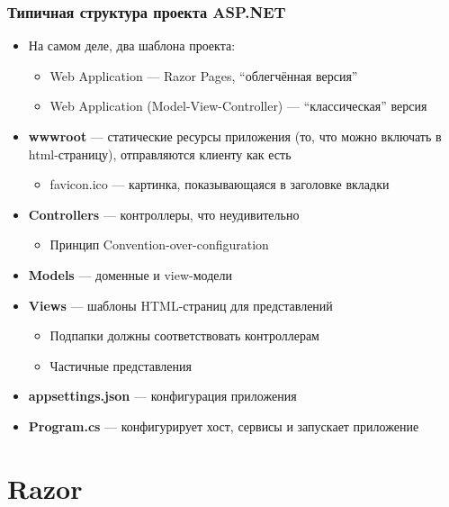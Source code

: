 \documentclass[xetex,mathserif,serif]{beamer}
\begin{document}
    \begin{frame}
        \frametitle{Типичная структура проекта ASP.NET}
        \begin{itemize}
            \item На самом деле, два шаблона проекта:
            \begin{itemize}
                \item Web Application --- Razor Pages, ``облегчённая версия''
                \item Web Application (Model-View-Controller) --- ``классическая'' версия
            \end{itemize}
            \item \textbf{wwwroot} --- статические ресурсы приложения (то, что можно включать в html-страницу), отправляются клиенту как есть
            \begin{itemize}
                \item favicon.ico --- картинка, показывающаяся в заголовке вкладки
            \end{itemize}
            \item \textbf{Controllers} --- контроллеры, что неудивительно
            \begin{itemize}
                \item Принцип Convention-over-configuration
            \end{itemize}
            \item \textbf{Models} --- доменные и view-модели
            \item \textbf{Views} --- шаблоны HTML-страниц для представлений
            \begin{itemize}
                \item Подпапки должны соответствовать контроллерам
                \item Частичные представления
            \end{itemize}
            \item \textbf{appsettings.json} --- конфигурация приложения
            \item \textbf{Program.cs} --- конфигурирует хост, сервисы и запускает приложение
        \end{itemize}
    \end{frame}

    \section{Razor}
\end{document}

